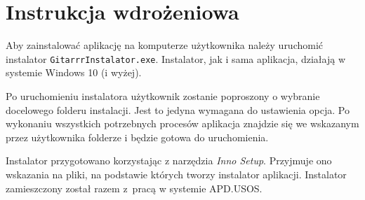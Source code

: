 \chapter{Instrukcja wdrożeniowa}

Aby zainstalować aplikację na komputerze użytkownika należy uruchomić instalator \texttt{GitarrrInstalator.exe}. Instalator, jak i sama aplikacja, działają w systemie Windows 10 (i wyżej). 

Po uruchomieniu instalatora użytkownik zostanie poproszony o wybranie docelowego folderu instalacji. Jest to jedyna wymagana do ustawienia opcja. Po wykonaniu wszystkich potrzebnych procesów aplikacja znajdzie się we wskazanym przez użytkownika folderze i będzie gotowa do uruchomienia.


Instalator przygotowano korzystając z narzędzia \emph{Inno Setup}. Przyjmuje ono wskazania na pliki, na podstawie których tworzy instalator aplikacji. %
Instalator zamieszczony został razem z~pracą w systemie APD.USOS.
